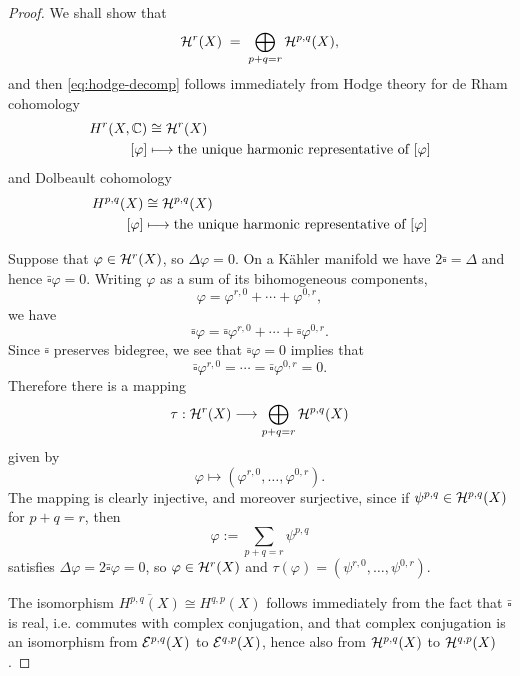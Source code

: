\documentclass[12pt]{article}
\begin{document}
\begin{proof}
We shall show that
\[
{\mathcal{H}}^r(X) \;=\; \bigoplus_{p+q=r} {\mathcal{H}}^{p,q}(X),
\]
and then \eqref{eq:hodge-decomp} follows immediately from Hodge theory for de Rham cohomology \begin{align*}
H^r(X,\mathbb{C}) & \cong {\mathcal{H}}^r(X) \\
[\varphi] & \longmapsto \text{the unique harmonic representative of } [\varphi]
\end{align*}
and Dolbeault cohomology \begin{align*}
H^{p,q}(X) & \cong {\mathcal{H}}^{p,q}(X) \\
[\varphi] & \longmapsto \text{the unique harmonic representative of } [\varphi]
\end{align*}

Suppose that $\varphi\in{\mathcal{H}}^r(X)$, so $\Delta\varphi=0$. On a K\"ahler
manifold we have $2\bar\square = \Delta$ and hence
$\bar\square\varphi=0$. Writing $\varphi$ as a sum of its bihomogeneous components,
\[
\varphi = \varphi^{r,0} + \cdots + \varphi^{0,r},
\]
we have
\[
\bar\square\varphi
 = \bar\square\varphi^{r,0} + \cdots + \bar\square\varphi^{0,r}.
\]
Since $\bar\square$ preserves bidegree, we see that
$\bar\square\varphi=0$ implies that
\[
\bar\square\varphi^{r,0}
 = \cdots
 = \bar\square\varphi^{0,r}
 = 0.
\]
Therefore there is a mapping
\[
\tau:{\mathcal{H}}^r(X)\longrightarrow \bigoplus_{p+q=r}{\mathcal{H}}^{p,q}(X)
\]
given by
\[
\varphi \longmapsto (\varphi^{r,0},\dots,\varphi^{0,r}).
\]
The mapping is clearly injective, and moreover surjective, since if
$\psi^{p,q}\in{\mathcal{H}}^{p,q}(X)$ for $p+q=r$, then
\[\varphi := \sum_{p+q=r} \psi^{p,q}
\]satisfies $\Delta\varphi=2\bar\square\varphi=0$, so
$\varphi\in{\mathcal{H}}^r(X)$ and $\tau(\varphi)=(\psi^{r,0},\dots,\psi^{0,r})$.

The isomorphism $\overline{H^{p,q}(X)} \cong H^{q,p}(X)$ follows immediately from the fact that
$\bar\square$ is real, i.e. commutes with complex conjugation, and that complex conjugation is an
isomorphism from ${\mathcal{E}}^{p,q}(X)$ to ${\mathcal{E}}^{q,p}(X)$, hence also from
${\mathcal{H}}^{p,q}(X)$ to ${\mathcal{H}}^{q,p}(X)$.
\end{proof}
\end{document}
